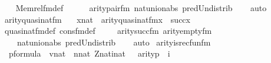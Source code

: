 \begin{isabellebody}
%
\isadelimproof
\ \ %
\endisadelimproof
%
\isatagproof
{}\isamarkupfalse%
\ Memrel{\isacharunderscore}{\kern0pt}fm{\isacharunderscore}{\kern0pt}def\ \isanewline
\ \ \isamarkupfalse%
\ \ arity{\isacharunderscore}{\kern0pt}pair{\isacharunderscore}{\kern0pt}fm\ nat{\isacharunderscore}{\kern0pt}union{\isacharunderscore}{\kern0pt}abs{}\ pred{\isacharunderscore}{\kern0pt}Un{\isacharunderscore}{\kern0pt}distrib\isanewline
\ \ \isamarkupfalse%
\ auto%
\endisatagproof
{\isafoldproof}%
%
\isadelimproof
\isanewline
%
\endisadelimproof
\isanewline
{}\isamarkupfalse%
\ arity{\isacharunderscore}{\kern0pt}quasinat{\isacharunderscore}{\kern0pt}fm\ {\isacharcolon}{\kern0pt}\isanewline
\ \ {\isachardoublequoteopen}{\isasymlbrakk}x{\isasymin}nat{\isasymrbrakk}\ {\isasymLongrightarrow}\ arity{\isacharparenleft}{\kern0pt}quasinat{\isacharunderscore}{\kern0pt}fm{\isacharparenleft}{\kern0pt}x{\isacharparenright}{\kern0pt}{\isacharparenright}{\kern0pt}\ {\isacharequal}{\kern0pt}\ succ{\isacharparenleft}{\kern0pt}x{\isacharparenright}{\kern0pt}{\isachardoublequoteclose}\isanewline
%
\isadelimproof
\ \ %
\endisadelimproof
%
\isatagproof
{}\isamarkupfalse%
\ quasinat{\isacharunderscore}{\kern0pt}fm{\isacharunderscore}{\kern0pt}def\ cons{\isacharunderscore}{\kern0pt}fm{\isacharunderscore}{\kern0pt}def\ \isanewline
\ \ \isamarkupfalse%
\ arity{\isacharunderscore}{\kern0pt}succ{\isacharunderscore}{\kern0pt}fm\ arity{\isacharunderscore}{\kern0pt}empty{\isacharunderscore}{\kern0pt}fm\isanewline
\ \ \ \ nat{\isacharunderscore}{\kern0pt}union{\isacharunderscore}{\kern0pt}abs{}\ pred{\isacharunderscore}{\kern0pt}Un{\isacharunderscore}{\kern0pt}distrib\isanewline
\ \ \isamarkupfalse%
\ auto%
\endisatagproof
{\isafoldproof}%
%
\isadelimproof
\isanewline
%
\endisadelimproof
\isanewline
{}\isamarkupfalse%
\ arity{\isacharunderscore}{\kern0pt}is{\isacharunderscore}{\kern0pt}recfun{\isacharunderscore}{\kern0pt}fm\ {\isacharcolon}{\kern0pt}\isanewline
\ \ {\isachardoublequoteopen}{\isasymlbrakk}p{\isasymin}formula\ {\isacharsemicolon}{\kern0pt}\ v{\isasymin}nat\ {\isacharsemicolon}{\kern0pt}\ n{\isasymin}nat{\isacharsemicolon}{\kern0pt}\ Z{\isasymin}nat{\isacharsemicolon}{\kern0pt}i{\isasymin}nat{\isasymrbrakk}\ {\isasymLongrightarrow}\ \ arity{\isacharparenleft}{\kern0pt}p{\isacharparenright}{\kern0pt}\ {\isacharequal}{\kern0pt}\ i\ {\isasymLongrightarrow}\ \isanewline

\end{isabellebody}
